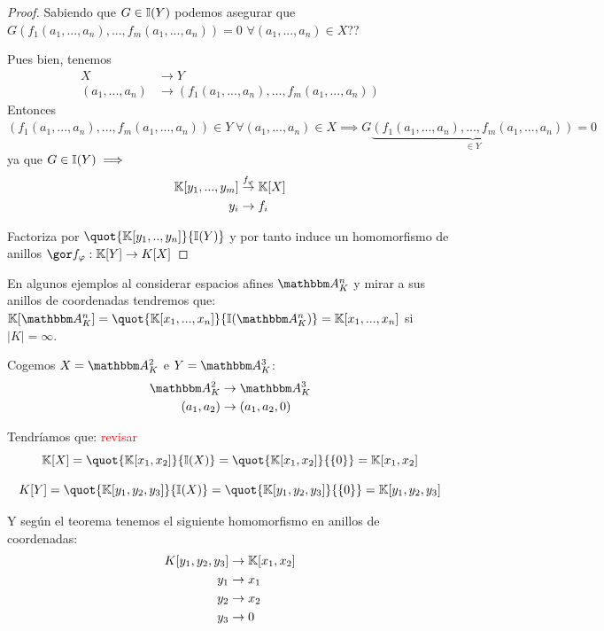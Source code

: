 \begin{proof}
Sabiendo que $G \in \mathbb{I}(Y)$ podemos asegurar que $G(f_1(a_1,...,a_n),...,f_m(a_1,...,a_n))=0$ $\forall (a_1,...,a_n) \in X$??

Pues bien, tenemos
\begin{align*}
	X & \rightarrow Y \\
	(a_1,...,a_n) & \rightarrow (f_1(a_1,...,a_n),...,f_m(a_1,...,a_n))
\end{align*}
Entonces $(f_1(a_1,...,a_n),...,f_m(a_1,...,a_n)) \in Y \; \forall (a_1,...,a_n) \in X \implies G\underbrace{(f_1(a_1,...,a_n),...,f_m(a_1,...,a_n))}_{\in Y}=0$ ya que $G \in \mathbb{I}(Y) \implies $
\begin{align*}
	\mathbb{K}[y_1,...,y_m] & \stackrel{f_{\varphi}}{\rightarrow} \mathbb{K}[X] \\
	y_i & \rightarrow f_i
\end{align*}

Factoriza por $\quot{\K[y_1,..,y_n]}{\I(Y)}$ y por tanto induce un homomorfismo de anillos $\cls{f_{\varphi}}: \K[Y] \rightarrow K[X]$
\end{proof}

\nota En algunos ejemplos al considerar espacios afines $\Akn$ y mirar a sus anillos de coordenadas tendremos que: $\K[\Akn]=\quot{\K[x_1,...,x_n]}{\I(\Akn)}=\K[x_1,...,x_n]$ si $|K|=\infty$.

\begin{example}
	Cogemos $X=\A_K^2$ e $Y=\A_K^3$:
	\begin{align*}
		\A_K^2 & \rightarrow \A_K^3 \\
		(a_1,a_2) & \rightarrow (a_1,a_2,0)
	\end{align*}

	Tendríamos que: \textcolor{red}{revisar} $$\K[X]=\quot{\K[x_1,x_2]}{\I(X)}=\quot{\K[x_1,x_2]}{\{0\}} = \K[x_1,x_2]$$

	$$ K[Y]=\quot{\K[y_1,y_2,y_3]}{\I(X)}=\quot{\K[y_1,y_2,y_3]}{\{0\}} = \K[y_1,y_2,y_3] $$

	Y según el teorema tenemos el siguiente homomorfismo en anillos de coordenadas:
	\begin{align*}
		K[y_1,y_2,y_3] & \rightarrow \mathbb{K}[x_1,x_2] \\
		y_1 & \rightarrow x_1 \\
		y_2 & \rightarrow x_2 \\
		y_3 & \rightarrow 0 \\
	\end{align*}
\end{example}


